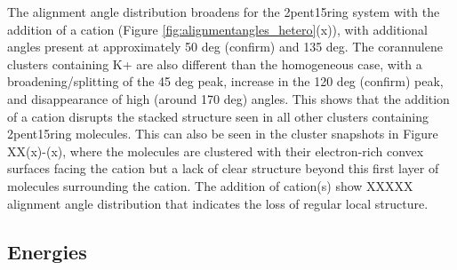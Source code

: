 The alignment angle distribution broadens for the 2pent15ring system with the addition of a cation (Figure \ref{fig:alignmentangles_hetero}(x)), with additional angles present at approximately 50 deg (confirm) and 135 deg.
The corannulene clusters containing K+ are also different than the homogeneous case, with a broadening/splitting of the 45 deg peak, increase in the 120 deg (confirm) peak, and disappearance of high (around 170 deg) angles. This shows that the addition of a cation disrupts the stacked structure seen in all other clusters containing 2pent15ring molecules. This can also be seen in the cluster snapshots in Figure XX(x)-(x), where the molecules are clustered with their electron-rich convex surfaces facing the cation but a lack of clear structure beyond this first layer of molecules surrounding the cation.
The addition of cation(s) show XXXXX alignment angle distribution that indicates the loss of regular local structure.


\subsection{Energies}

